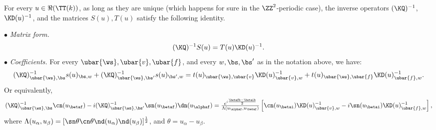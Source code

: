 \documentclass[a4paper,twoside,11pt]{article}
\begin{document}
\begin{cor}\label{cor:KD_KQ}
For every $u\in\Re(\TT(k))$, as long as they are unique (which happens for sure
in the $\ZZ^2$-periodic case), the inverse operators $(\KQ)^{-1}$, $\KD(u)^{-1}$, and the matrices $S(u),T(u)$ satisfy the following 
identity.

$\bullet$ \emph{Matrix form.}
\begin{equation*}
(\KQ)^{-1}S(u)=T(u)\KD(u)^{-1}.
\end{equation*}
$\bullet$ \emph{Coefficients.} For every $\ubar{\ws},\ubar{v},\ubar{f}$, and every $w,\bs,\bs'$ as in the notation above, we have:
\begin{equation*}
(\KQ)^{-1}_{\ubar{\ws},\bs}s(u)_{\bs,w}+ (\KQ)^{-1}_{\ubar{\ws},\bs'}s(u)_{\bs',w}=
t(u)_{\ubar{\ws},\ubar{v}}\KD(u)^{-1}_{\ubar{v},w}+t(u)_{\ubar{\ws},\ubar{f}}\KD(u)^{-1}_{\ubar{f},w}.
\end{equation*}
Or equivalently,
\begin{equation}\label{equ:KQKD_gen}
\textstyle
(\KQ)^{-1}_{\ubar{\ws},\bs}\cn(u_{\betaf})-i(\KQ)^{-1}_{\ubar{\ws},\bs'}\sn(u_{\betaf})\dn(u_{\alphaf})
=\frac{e^{i\frac{\betafb-\betaib}{2}}}{\Lambda(u_{\alphaf},u_{\betaf})}
\left[\cn(u_{\betai})\KD(u)^{-1}_{\ubar{v},w}-i\sn({u_{\betai}})\KD(u)^{-1}_{\ubar{f},w}\right],
\end{equation}
where $\Lambda(u_\alpha,u_\beta)=[\sn\theta\cn\theta\nd(u_{\alpha})\nd(u_{\beta})]^{\frac{1}{2}}$, and 
$\theta=u_\alpha-u_\beta$.
\end{cor}
\end{document}
